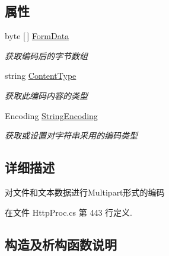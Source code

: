 \subsection*{属性}
\begin{DoxyCompactItemize}
\item 
byte \mbox{[}$\,$\mbox{]} \hyperlink{class_x_c_l_net_tools_1_1_file_handler_1_1_multipart_form_ad540886372239dbb4fcc975e694be5d9}{Form\+Data}
\begin{DoxyCompactList}\small\item\em 获取编码后的字节数组 \end{DoxyCompactList}\item 
string \hyperlink{class_x_c_l_net_tools_1_1_file_handler_1_1_multipart_form_a634f22e875a4d7eb49a729dcb2903f86}{Content\+Type}
\begin{DoxyCompactList}\small\item\em 获取此编码内容的类型 \end{DoxyCompactList}\item 
Encoding \hyperlink{class_x_c_l_net_tools_1_1_file_handler_1_1_multipart_form_ade83206c0e41ad24ba543ebd89e0281f}{String\+Encoding}
\begin{DoxyCompactList}\small\item\em 获取或设置对字符串采用的编码类型 \end{DoxyCompactList}\end{DoxyCompactItemize}


\subsection{详细描述}
对文件和文本数据进行\+Multipart形式的编码 



在文件 Http\+Proc.\+cs 第 443 行定义.



\subsection{构造及析构函数说明}
\mbox{\label{class_x_c_l_net_tools_1_1_file_handler_1_1_multipart_form_ab1d1debcf1e0f5dc05e9758f72b4500d}} 
